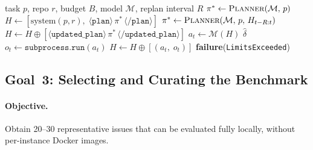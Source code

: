 \documentclass[11pt]{article}
\begin{document}
\begin{algorithm}[ht]
\caption{Planner--executor agent (\texttt{PlannerExecutorAgent})}
\label{alg:planner}
\begin{algorithmic}[1]
\Require task $p$, repo $r$, budget $B$, model $\mathcal{M}$, replan interval $R$
\State $\pi^* \gets \textsc{Planner}(\mathcal{M},\, p)$
\State $H \gets [\text{system}(p, r),\;
      \langle\!\texttt{plan}\!\rangle\,\pi^*\,\langle\!/\!\texttt{plan}\!\rangle]$
    \State $\pi^* \gets \textsc{Planner}(\mathcal{M},\, p,\,
          H_{t-R:t})$
    \State $H \gets H \oplus
          [\langle\!\texttt{updated\_plan}\!\rangle\,\pi^*\,
           \langle\!/\!\texttt{updated\_plan}\!\rangle]$
  \EndIf
  \State $a_t \gets \mathcal{M}(H)$
   \Return $\hat{\delta}$ \EndIf
  \State $o_t \gets \texttt{subprocess.run}(a_t)$
  \State $H \gets H \oplus [(a_t,\; o_t)]$
\EndFor
\State \Return \textbf{failure}(\texttt{LimitsExceeded})
\end{algorithmic}
\end{algorithm}

\subsection{Goal~3: Selecting and Curating the Benchmark}
\label{sec:goal-bench}

\paragraph{Objective.}
Obtain 20--30 representative issues that can be evaluated fully locally,
without per-instance Docker images.
\end{document}
